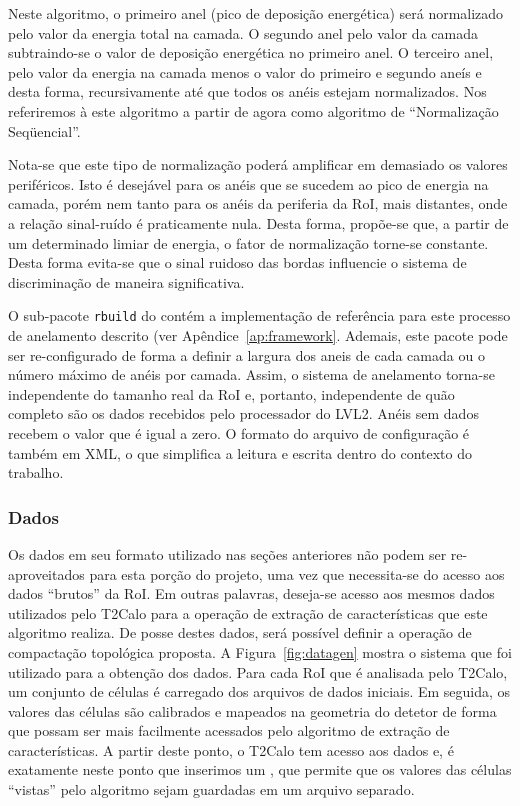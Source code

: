 Neste algoritmo, o primeiro anel (pico de deposição energética) será
normalizado pelo valor da energia total na camada. O segundo anel pelo valor
da camada subtraindo-se o valor de deposição energética no primeiro anel. O
terceiro anel, pelo valor da energia na camada menos o valor do primeiro e
segundo aneís e desta forma, recursivamente até que todos os anéis estejam
normalizados. Nos referiremos à este algoritmo a partir de agora como
algoritmo de ``Normalização Seqüencial''.

Nota-se que este tipo de normalização poderá amplificar em demasiado os
valores periféricos. Isto é desejável para os anéis que se sucedem ao pico de
energia na camada, porém nem tanto para os anéis da periferia da RoI, mais
distantes, onde a relação sinal-ruído é praticamente nula. Desta forma,
propõe-se que, a partir de um determinado limiar de energia, o fator de
normalização torne-se constante. Desta forma evita-se que o sinal ruidoso das
bordas influencie o sistema de discriminação de maneira significativa.

O sub-pacote \texttt{rbuild} do  contém a implementação de
referência para este processo de anelamento descrito (ver
Apêndice~\ref{ap:framework}. Ademais, este pacote pode ser re-configurado de
forma a definir a largura dos aneis de cada camada ou o número máximo de anéis
por camada. Assim, o sistema de anelamento torna-se independente do tamanho
real da RoI e, portanto, independente de quão completo são os dados recebidos
pelo processador do LVL2. Anéis sem dados recebem o valor  que é
igual a zero. O formato do arquivo de configuração é também em XML, o que
simplifica a leitura e escrita dentro do contexto do trabalho.

\subsubsection{Dados}

Os dados em seu formato utilizado nas seções anteriores não podem ser
re-aproveitados para esta porção do projeto, uma vez que necessita-se do
acesso aos dados ``brutos'' da RoI. Em outras palavras, deseja-se acesso aos
mesmos dados utilizados pelo T2Calo para a operação de extração de
características que este algoritmo realiza. De posse destes dados, será
possível definir a operação de compactação topológica proposta. A
Figura~\ref{fig:datagen} mostra o sistema que foi utilizado para a obtenção
dos dados. Para cada RoI que é analisada pelo T2Calo, um conjunto de células é
carregado dos arquivos de dados iniciais. Em seguida, os valores das células
são calibrados e mapeados na geometria do detetor de forma que possam ser mais
facilmente acessados pelo algoritmo de extração de características. A partir
deste ponto, o T2Calo tem acesso aos dados e, é exatamente neste ponto que
inserimos um , que permite que os valores das células ``vistas''
pelo algoritmo sejam guardadas em um arquivo separado.

